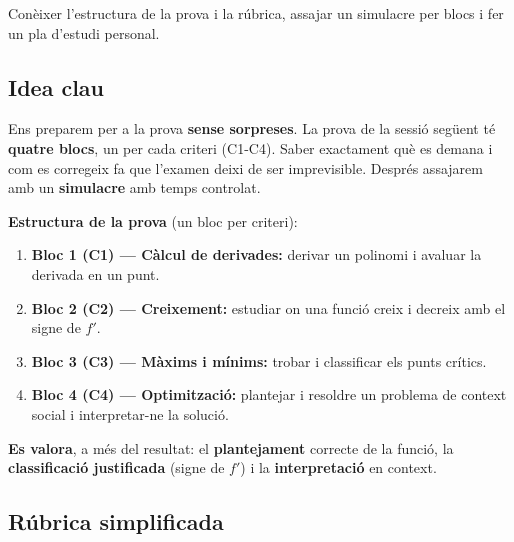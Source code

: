 %
{Conèixer l'estructura de la prova i la rúbrica, assajar un simulacre per blocs i fer un pla d'estudi personal.}

\subsection{Idea clau}

Ens preparem per a la prova \textbf{sense sorpreses}. La prova de la sessió següent té
\textbf{quatre blocs}, un per cada criteri (C1-C4). Saber exactament què es demana i
com es corregeix fa que l'examen deixi de ser imprevisible. Després assajarem amb un
\textbf{simulacre} amb temps controlat.

\begin{idea}
\textbf{Estructura de la prova} (un bloc per criteri):
\begin{enumerate}[leftmargin=1.6em, itemsep=2pt]
  \item \textbf{Bloc 1 (C1) — Càlcul de derivades:} derivar un polinomi i avaluar la
        derivada en un punt.
  \item \textbf{Bloc 2 (C2) — Creixement:} estudiar on una funció creix i decreix amb el
        signe de $f'$.
  \item \textbf{Bloc 3 (C3) — Màxims i mínims:} trobar i classificar els punts crítics.
  \item \textbf{Bloc 4 (C4) — Optimització:} plantejar i resoldre un problema de context
        social i interpretar-ne la solució.
\end{enumerate}
\textbf{Es valora}, a més del resultat: el \textbf{plantejament} correcte de la funció,
la \textbf{classificació justificada} (signe de $f'$) i la \textbf{interpretació} en
context.
\end{idea}

\subsection{Rúbrica simplificada}

